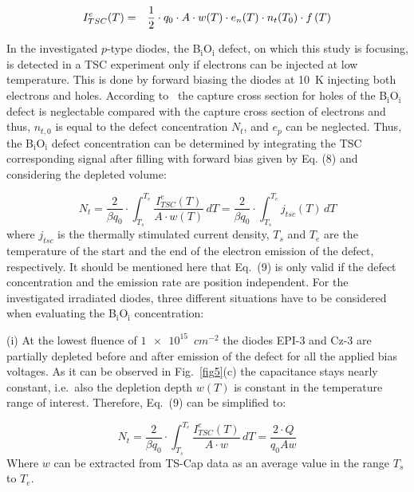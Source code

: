 \documentclass[final, 5p, times]{elsarticle}
\begin{document}
\begin{eqnarray} 
I^{e}_{TSC} (T) & = & {1 \over 2} \cdot q_0 \cdot A \cdot w(T) \cdot e_{n}(T) \cdot n_t(T_0) \cdot f\left(T\right)  
\end{eqnarray}
\par
In the investigated $p$-type diodes, the B$_\text{i}$O$_\text{i}$ defect, on which this study is focusing, is detected in a TSC experiment only if electrons can be injected at low temperature. This is done by forward biasing the diodes at 10~K injecting both electrons and holes. According to~\cite{b33} the capture cross section for holes of the B$_\text{i}$O$_\text{i}$ defect is neglectable compared with the capture cross section of electrons and thus, $n_{t,0}$ is equal to the defect concentration $N_t$, and $e_p$ can be neglected. Thus, the B$_\text{i}$O$_\text{i}$ defect concentration can be determined by integrating the TSC corresponding signal after filling with forward bias given by Eq. (8) and considering the depleted volume:
\par
\begin{equation}
   N_t = \frac{2}{\beta q_0} \cdot \int_{T_s}^{T_e} \frac{I^{e}_{TSC}(T)}
   {A \cdot w(T)}\,dT =  \frac{2}{\beta q_0} \cdot \int_{T_s}^{T_e} j_{tsc}(T)\,dT
\end{equation}
where $j_{tsc}$ is the thermally stimulated current density, $T_s$ and $T_e$ are the temperature of the start and the end of the electron emission of the defect, respectively. It should be mentioned here that Eq.~(9) is only valid if the defect concentration and the emission rate are position independent. For the investigated irradiated diodes, three different situations have to be considered when evaluating the B$_\text{i}$O$_\text{i}$ concentration: 
\par
(i) At the lowest fluence of $\num{1e15}$~$\si{cm^{-2}}$ the diodes EPI-3 and Cz-3 are partially depleted before and after emission of the defect for all the applied bias voltages. As it can be observed in Fig.~\ref{fig5}(c) the capacitance stays nearly constant, i.e.\ also the depletion depth $w(T)$ is constant in the temperature range of interest. Therefore, Eq.~(9) can be simplified to:
\par
\begin{equation} 
N_t = \frac{2}{\beta q_0} \cdot \int_{T_s}^{T_e} \frac{I^{e}_{TSC}(T)}
   {A \cdot w}\,dT = \frac{2 \cdot Q}{q_0  A  w}
\end{equation}
Where $w$ can be extracted from TS-Cap data as an average value in the range $T_s$ to $T_e$. 
\par
\end{document}
